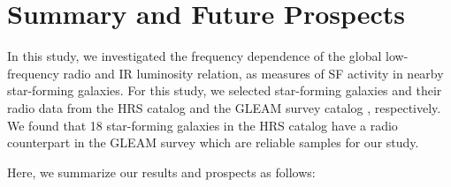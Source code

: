 \chapter{Summary and Future Prospects}\label{chap:summary}
%
%

In this study, we investigated the frequency dependence of the global low-frequency radio and IR luminosity relation, as measures of SF activity in nearby star-forming galaxies.
For this study, we selected star-forming galaxies and their radio data from the HRS catalog \citep{Boselli2010} and the GLEAM survey catalog \citep{Hurley-Walker2017a}, respectively. We found that 18 star-forming galaxies in the HRS catalog have a radio counterpart in the GLEAM survey which are reliable samples for our study.

Here, we summarize our results and prospects as follows:

